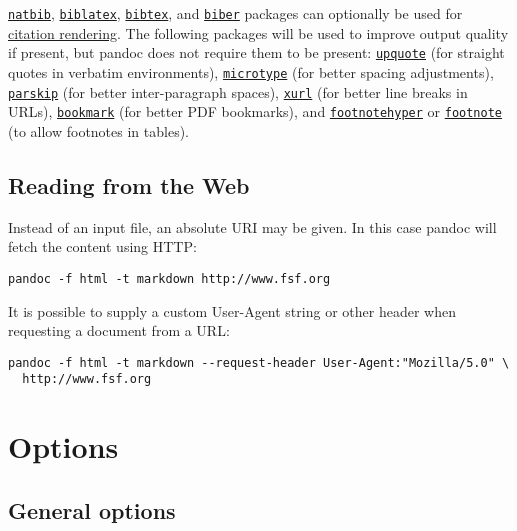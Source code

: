 \documentclass[
  12pt,
  a4paper,
]{article}
\begin{document}
\href{https://ctan.org/pkg/natbib}{\texttt{natbib}},
\href{https://ctan.org/pkg/biblatex}{\texttt{biblatex}},
\href{https://ctan.org/pkg/bibtex}{\texttt{bibtex}}, and
\href{https://ctan.org/pkg/biber}{\texttt{biber}} packages can optionally be used for
\protect\hyperlink{citation-rendering}{citation rendering}. The following packages will be used to
improve output quality if present, but pandoc does not require them to be present:
\href{https://ctan.org/pkg/upquote}{\texttt{upquote}} (for straight quotes in verbatim
environments), \href{https://ctan.org/pkg/microtype}{\texttt{microtype}} (for better spacing
adjustments), \href{https://ctan.org/pkg/parskip}{\texttt{parskip}} (for better inter-paragraph
spaces), \href{https://ctan.org/pkg/xurl}{\texttt{xurl}} (for better line breaks in URLs),
\href{https://ctan.org/pkg/bookmark}{\texttt{bookmark}} (for better PDF bookmarks), and
\href{https://ctan.org/pkg/footnotehyper}{\texttt{footnotehyper}} or
\href{https://ctan.org/pkg/footnote}{\texttt{footnote}} (to allow footnotes in tables).

\hypertarget{reading-from-the-web}{%
\subsection{Reading from the Web}\label{reading-from-the-web}}

Instead of an input file, an absolute URI may be given. In this case pandoc will fetch the content
using HTTP:

\begin{verbatim}
pandoc -f html -t markdown http://www.fsf.org
\end{verbatim}

It is possible to supply a custom User-Agent string or other header when requesting a document
from a URL:

\begin{verbatim}
pandoc -f html -t markdown --request-header User-Agent:"Mozilla/5.0" \
  http://www.fsf.org
\end{verbatim}

\hypertarget{options}{%
\section{Options}\label{options}}

\hypertarget{general-options}{%
\subsection{General options}\label{general-options}}
\end{document}
